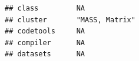 \documentclass[]{article}
\begin{document}
\begin{verbatim}
## class         NA                                                                                                                                                                                                                                                                                                                                                                                                                                                                                                                                                                                        
## cluster       "MASS, Matrix"                                                                                                                                                                                                                                                                                                                                                                                                                                                                                                                                                                            
## codetools     NA                                                                                                                                                                                                                                                                                                                                                                                                                                                                                                                                                                                        
## compiler      NA                                                                                                                                                                                                                                                                                                                                                                                                                                                                                                                                                                                        
## datasets      NA                                                                                                                                                                                                                                                                                                                                                                                                                                                                                                                                                                                        

\end{verbatim}
\end{document}
